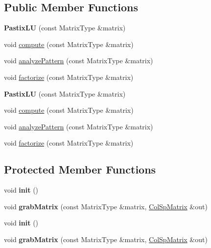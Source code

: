 \subsection*{Public Member Functions}
\begin{DoxyCompactItemize}
\item 
\mbox{\label{class_eigen_1_1_pastix_l_u_a7d080a8a45f2fd33ba174333c60f87b8}} 
{\bfseries Pastix\+LU} (const Matrix\+Type \&matrix)
\item 
void \hyperlink{class_eigen_1_1_pastix_l_u_adc28ee2550086c7bdfe991d624bde2ee}{compute} (const Matrix\+Type \&matrix)
\item 
void \hyperlink{class_eigen_1_1_pastix_l_u_abae3ca7f1254106d9e2d5e0f273189fa}{analyze\+Pattern} (const Matrix\+Type \&matrix)
\item 
void \hyperlink{class_eigen_1_1_pastix_l_u_ac178a87b499a2210a402787fbfd98f26}{factorize} (const Matrix\+Type \&matrix)
\item 
\mbox{\label{class_eigen_1_1_pastix_l_u_a7d080a8a45f2fd33ba174333c60f87b8}} 
{\bfseries Pastix\+LU} (const Matrix\+Type \&matrix)
\item 
void \hyperlink{class_eigen_1_1_pastix_l_u_adc28ee2550086c7bdfe991d624bde2ee}{compute} (const Matrix\+Type \&matrix)
\item 
void \hyperlink{class_eigen_1_1_pastix_l_u_abae3ca7f1254106d9e2d5e0f273189fa}{analyze\+Pattern} (const Matrix\+Type \&matrix)
\item 
void \hyperlink{class_eigen_1_1_pastix_l_u_ac178a87b499a2210a402787fbfd98f26}{factorize} (const Matrix\+Type \&matrix)
\end{DoxyCompactItemize}
\subsection*{Protected Member Functions}
\begin{DoxyCompactItemize}
\item 
\mbox{\label{class_eigen_1_1_pastix_l_u_afe75c3d2574bc61dfac397b8b420c376}} 
void {\bfseries init} ()
\item 
\mbox{\label{class_eigen_1_1_pastix_l_u_a2c8ec7fef67f389d3adde38f50dab05a}} 
void {\bfseries grab\+Matrix} (const Matrix\+Type \&matrix, \hyperlink{group___sparse_core___module}{Col\+Sp\+Matrix} \&out)
\item 
\mbox{\label{class_eigen_1_1_pastix_l_u_afe75c3d2574bc61dfac397b8b420c376}} 
void {\bfseries init} ()
\item 
\mbox{\label{class_eigen_1_1_pastix_l_u_a2c8ec7fef67f389d3adde38f50dab05a}} 
void {\bfseries grab\+Matrix} (const Matrix\+Type \&matrix, \hyperlink{group___sparse_core___module}{Col\+Sp\+Matrix} \&out)
\end{DoxyCompactItemize}

